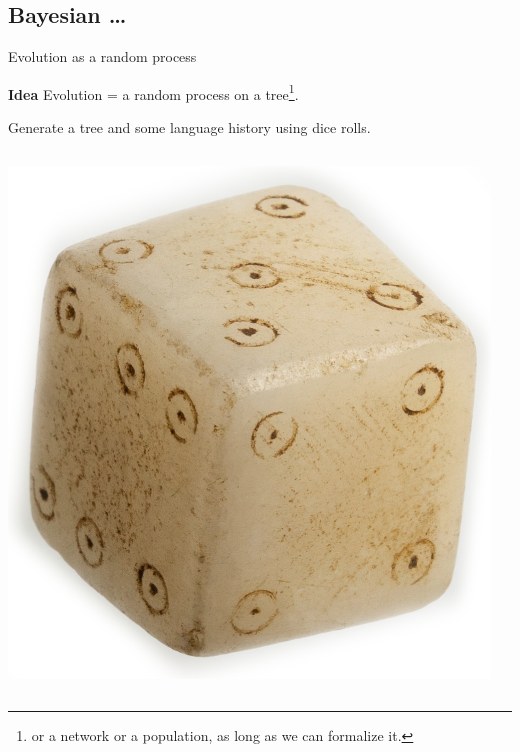 \documentclass[9pt]{beamer}
\newcommand{\paragraph}[1]{\par{\bfseries #1}}
\begin{document}
\subsection{Bayesian …}
\begin{frame}{Evolution as a random process}
  \paragraph{Idea} Evolution = a random process on a tree\footnote{or a network or
    a population, as long as we can formalize it.}.

  Generate a tree and some language history using dice rolls.

  \pause
  \begin{columns}
    \begin{column}{0.3\textwidth}
      \begin{center}
        \includegraphics[width=\textwidth]{dice.png}
      \end{center}
    \end{column}
    \begin{column}{0.7\textwidth}

\end{column}
\end{columns}
\end{frame}
\end{document}

